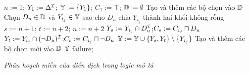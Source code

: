 \begin{algorithm}[t]
	\fontsize{13.5}{15}\selectfont
	\BlankLine
	$n:=1$; $Y_1 := \Delta^{\mathcal{I}}$; $\mathbb{Y} := \{Y_1\}$; $C_1 := \top$; $\mathbb{D} := \emptyset$\;
	Tạo và thêm các bộ chọn vào $\mathbb{D}$\label{step:CreateSelector1}
	{
		Chọn $D_u \in \mathbb{D}$ và $Y_{i_j} \in \mathbb{Y}$ sao cho $D_u$ chia $Y_{i_j}$ thành hai khối không rỗng\label{step:ChooseBlock}\;
		$s:=n+1$; $t:=n+2$; $n:=n+2$\;
		$Y_s := Y_{i_j} \cap D_u^{\mathcal{I}}$;\qquad\quad\!$C_s := C_{i_j} \sqcap D_u$\;
		$Y_t := Y_{i_j} \cap (\neg D_u)^{\mathcal{I}}$;\quad $C_t := C_{i_j} \sqcap \neg D_u$\;
		$\mathbb{Y} := \mathbb{Y} \cup \{Y_s, Y_t\} \setminus \{Y_{i_j}\}$\;    
		Tạo và thêm các bộ chọn mới vào $\mathbb{D}$\label{step:CreateSelector2}
	}
	{
		\Return $\mathbb{Y}$\;
	}
	{
		\Return failure;
	}
	\caption{{\em Phân hoạch miền của diễn dịch trong logic mô tả}} \label{alg:Partition}
\end{algorithm}

